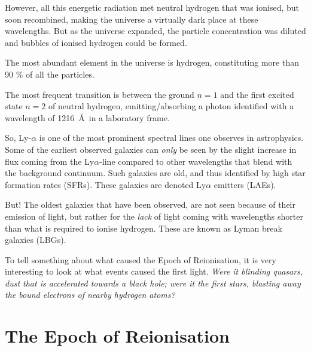 \documentclass[ignorenonframetext]{beamer}
\begin{document}
\begin{frame}
\begin{center}
{\begin{description}
                However, all this energetic radiation met neutral hydrogen that was ionised, but soon recombined, making the universe a virtually dark place at these wavelengths. But as the universe expanded, the particle concentration was diluted and bubbles of ionised hydrogen could be formed.
            \item[The first light]
                The most abundant element in the universe is hydrogen, constituting more than 90 \% of all the particles.
                
                The most frequent transition is between the ground $n=1$ and the first excited state $n=2$ of neutral hydrogen, emitting/absorbing a photon identified with a wavelength of 1216~\AA ~in a laboratory frame.

                So, Ly-$\alpha$ is one of the most prominent spectral lines one observes in astrophysics. Some of the earliest observed galaxies can \textit{only} be seen by the slight increase in flux coming from the Ly$\alpha$-line compared to other wavelengths that blend with the background continuum. Such galaxies are old, and thus identified by high star formation rates (SFRs). These galaxies are denoted Ly$\alpha$ emitters (LAEs).

                But! The oldest galaxies that have been observed, are not seen because of their emission of light, but rather for the \textit{lack} of light coming with wavelengths shorter than what is required to ionise hydrogen. These are known as Lyman break galaxies (LBGs).

                To tell something about what caused the Epoch of Reionisation, it is very interesting to look at what events caused the first light. \textit{Were it blinding quasars, dust that is accelerated towards a black hole; were it the first stars, blasting away the bound electrons of nearby hydrogen atoms?}
        \end{description}
    }

\end{center}
\end{frame}

\section{The Epoch of Reionisation}
\begin{frame}
\end{frame}
\end{document}

